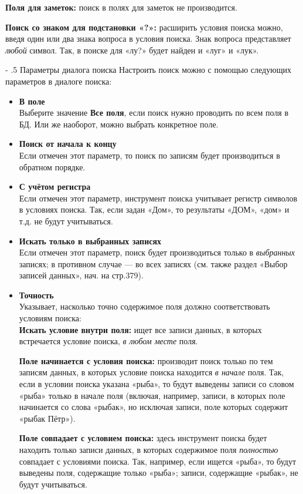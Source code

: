 ﻿\documentclass[a4paper,10pt]{article}
\makeatletter
\renewcommand\paragraph{%
   \@startsection{paragraph}{4}{0mm}%
      {-\baselineskip}%
      {.5\baselineskip}%
      {\normalfont\normalsize\bfseries}}
\makeatother
\begin{document}
\textbf{Поля для заметок:} поиск в полях для заметок не производится.

\textbf{Поиск со знаком для подстановки «?»:} расширить условия поиска можно, введя один или два знака вопроса в условия поиска. Знак вопроса представляет \textit{любой} символ. Так, в поиске для «лу?» будет найден и «луг» и «лук».

\paragraph{Параметры диалога поиска}
Настроить поиск можно с помощью следующих параметров в диалоге поиска:
\begin{itemize}
 \item \textbf{В поле}\\
 Выберите значение \textbf{Все поля}, если поиск нужно проводить по всем поля в БД. Или же наоборот, можно выбрать конкретное поле.
 \item \textbf{Поиск от начала к концу}\\
 Если отмечен этот параметр, то поиск по записям будет производиться в обратном порядке.
 \item \textbf{С учётом регистра}\\
 Если отмечен этот параметр, инструмент поиска учитывает регистр символов в условиях поиска. Так, если задан «Дом», то результаты «ДОМ», «дом» и т.д. не будут учитываться.
 \item \textbf{Искать только в выбранных записях}\\
 Если отмечен этот параметр, поиск будет производиться только в \textit{выбранных} записях; в противном случае — во всех записях (см. также раздел «Выбор записей данных», нач. на стр.379).
 \item \textbf{Точность}\\
 Указывает, насколько точно содержимое поля должно соответствовать условиям поиска:\\
 \textbf{Искать условие внутри поля:} ищет все записи данных, в которых встречается условие поиска, \textit{в любом месте} поля.
 
 \textbf{Поле начинается с условия поиска:} производит поиск только по тем записям данных, в которых условие поиска находится \textit{в начале} поля. Так, если в условии поиска указана «рыба», то будут выведены записи со словом «рыба» только в начале поля (включая, например, записи, в которых поле начинается со слова «рыбак»,  но исключая записи, поле которых содержит «рыбак Пётр»).
 
 \textbf{Поле совпадает с условием поиска:} здесь инструмент поиска будет находить только записи данных, в которых содержимое поля \textit{полностью} совпадает с условиями поиска. Так, например, если ищется «рыба», то будут выведены поля, содержащие только «рыба»; записи, содержащие «рыбак», не будут учитываться.
\end{itemize}
\end{document}
